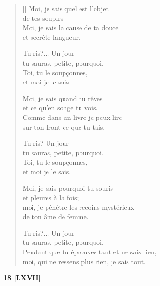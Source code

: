 \documentclass[a4paper,12pt]{book}
\begin{document}
\begin{verse}[\versewidth]
  Moi, je sais quel est l'objet \\
  de tes soupirs; \\
  Moi, je sais la cause de ta douce \\
  et secrète langueur.

  Tu ris?... Un jour \\
  tu sauras, petite, pourquoi. \\
  Toi, tu le soupçonnes, \\
  et moi je le sais.

  Moi, je sais quand tu rêves \\
  et ce qu'en songe tu vois. \\
  Comme dans un livre je peux lire \\
  sur ton front ce que tu tais.

  Tu ris? Un jour \\
  tu sauras, petite, pourquoi. \\
  Toi, tu le soupçonnes, \\
  et moi je le sais.

  Moi, je sais pourquoi tu souris \\
  et pleures à la fois; \\
  moi, je pénètre les recoins mystérieux \\
  de ton âme de femme.

  Tu ris?... Un jour \\
  tu sauras, petite, pourquoi. \\
  Pendant que tu éprouves tant et ne sais rien, \\
  moi, qui ne ressens plus rien, je sais tout.
\end{verse}

\bigskip

\begin{center}
  \textbf{18 [LXVII]}
\end{center}

\settowidth{\versewidth}{que de bien dormir... et ronfler comme un sous-chantre...}
\end{document}

